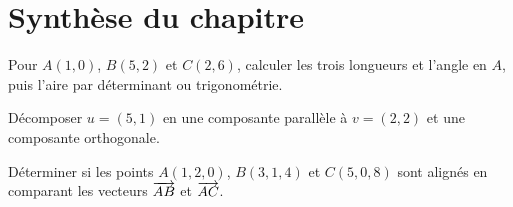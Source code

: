 \section*{Synthèse du chapitre}
\begin{synthesisbox}
\item Pour $A(1,0)$, $B(5,2)$ et $C(2,6)$, calculer les trois longueurs et l'angle en $A$, puis l'aire par déterminant ou trigonométrie.
\item Décomposer $u=(5,1)$ en une composante parallèle à $v=(2,2)$ et une composante orthogonale.
\item Déterminer si les points $A(1,2,0)$, $B(3,1,4)$ et $C(5,0,8)$ sont alignés en comparant les vecteurs $\overrightarrow{AB}$ et $\overrightarrow{AC}$.
\end{synthesisbox}

